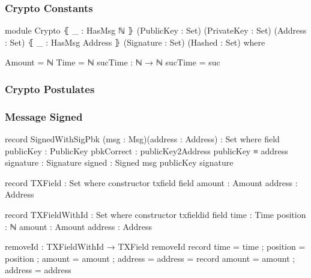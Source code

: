 \documentclass{beamer}
\begin{document}
\begin{frame}
  \frametitle{Crypto Constants}
\begin{code}

module Crypto
  ⦃ _ : HasMsg ℕ ⦄
  (PublicKey : Set)
  (PrivateKey : Set)
  (Address : Set)
  ⦃ _ : HasMsg Address ⦄
  (Signature : Set)
  (Hashed : Set)
  where

  Amount = ℕ
  Time = ℕ
  sucTime : ℕ → ℕ
  sucTime = suc

\end{code}
\end{frame}
\begin{frame}
  \frametitle{Crypto Postulates}
\end{frame}
\begin{frame}
  \frametitle{Message Signed}
\begin{code}
    record SignedWithSigPbk (msg : Msg)(address : Address)
      : Set where
      field
        publicKey   :  PublicKey
        pbkCorrect  :  publicKey2Address publicKey ≡ address
        signature   :  Signature
        signed      :  Signed msg publicKey signature

\end{code}
\end{frame}
\begin{frame}
\begin{code}

    record TXField : Set where
      constructor txfield
      field
        amount  : Amount
        address : Address

    record TXFieldWithId : Set where
      constructor txfieldid
      field
        time     : Time
        position : ℕ
        amount   : Amount
        address  : Address

    removeId : TXFieldWithId → TXField
    removeId record { time = time ; position = position
      ; amount = amount ; address = address }
      = record { amount = amount ; address = address }

\end{code}
\end{frame}
\end{document}
